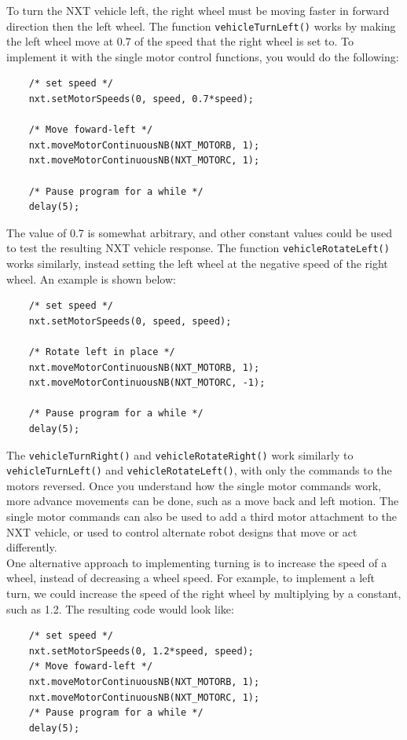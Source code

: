 \noindent
To turn the NXT vehicle left, the right wheel must be moving faster in forward direction then the 
left wheel.  The function \verb+vehicleTurnLeft()+ works by making the left wheel move at 0.7 of the 
speed that the right wheel is set to. To implement it with the single motor control functions, you 
would do the following:
\begin{verbatim}
    /* set speed */
    nxt.setMotorSpeeds(0, speed, 0.7*speed);

    /* Move foward-left */
    nxt.moveMotorContinuousNB(NXT_MOTORB, 1);
    nxt.moveMotorContinuousNB(NXT_MOTORC, 1);

    /* Pause program for a while */
    delay(5);
\end{verbatim}
\noindent
The value of 0.7 is somewhat arbitrary, and other constant values could be used to test the resulting
NXT vehicle response. The function \verb+vehicleRotateLeft()+ works similarly, instead setting the 
left wheel at the negative speed of the right wheel. An example is shown below:
\begin{verbatim}
    /* set speed */
    nxt.setMotorSpeeds(0, speed, speed);

    /* Rotate left in place */
    nxt.moveMotorContinuousNB(NXT_MOTORB, 1);
    nxt.moveMotorContinuousNB(NXT_MOTORC, -1);

    /* Pause program for a while */
    delay(5);
\end{verbatim}
\noindent
The \verb+vehicleTurnRight()+ and \verb+vehicleRotateRight()+ work similarly to \verb+vehicleTurnLeft()+
and \verb+vehicleRotateLeft()+, with only the commands to the motors reversed. Once you understand 
how the single motor commands work, more advance movements can be done, such as a move back and left 
motion.  The single motor commands can also be used to add a third motor attachment to the NXT 
vehicle, or used to control alternate robot designs that move or act differently.\\
\newline
\noindent
One alternative approach to implementing turning is to increase the speed of a wheel, instead of 
decreasing a wheel speed. For example, to implement a left turn, we could increase the speed of 
the right wheel by multiplying by a constant, such as 1.2.  The resulting code would look like:
\begin{verbatim}
    /* set speed */
    nxt.setMotorSpeeds(0, 1.2*speed, speed);
    /* Move foward-left */
    nxt.moveMotorContinuousNB(NXT_MOTORB, 1);
    nxt.moveMotorContinuousNB(NXT_MOTORC, 1);
    /* Pause program for a while */
    delay(5);
\end{verbatim}
